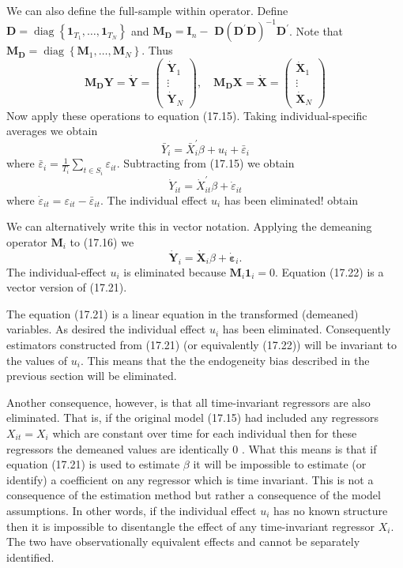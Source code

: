 \documentclass[10pt]{article}
\begin{document}
We can also define the full-sample within operator. Define $\boldsymbol{D}=\operatorname{diag}\left\{\mathbf{1}_{T_{1}}, \ldots, \mathbf{1}_{T_{N}}\right\}$ and $\boldsymbol{M}_{\boldsymbol{D}}=\boldsymbol{I}_{n}-$ $\boldsymbol{D}\left(\boldsymbol{D}^{\prime} \boldsymbol{D}\right)^{-1} \boldsymbol{D}^{\prime}$. Note that $\boldsymbol{M}_{\boldsymbol{D}}=\operatorname{diag}\left\{\boldsymbol{M}_{1}, \ldots, \boldsymbol{M}_{N}\right\}$. Thus
$$
\boldsymbol{M}_{\boldsymbol{D}} \boldsymbol{Y}=\dot{\boldsymbol{Y}}=\left(\begin{array}{c}
\dot{\boldsymbol{Y}}_{1} \\
\vdots \\
\dot{\boldsymbol{Y}}_{N}
\end{array}\right), \quad \boldsymbol{M}_{\boldsymbol{D}} \boldsymbol{X}=\dot{\boldsymbol{X}}=\left(\begin{array}{c}
\dot{\boldsymbol{X}}_{1} \\
\vdots \\
\dot{\boldsymbol{X}}_{N}
\end{array}\right)
$$
Now apply these operations to equation (17.15). Taking individual-specific averages we obtain
$$
\bar{Y}_{i}=\bar{X}_{i}^{\prime} \beta+u_{i}+\bar{\varepsilon}_{i}
$$
where $\bar{\varepsilon}_{i}=\frac{1}{T_{i}} \sum_{t \in S_{i}} \varepsilon_{i t}$. Subtracting from (17.15) we obtain
$$
\dot{Y}_{i t}=\dot{X}_{i t}^{\prime} \beta+\dot{\varepsilon}_{i t}
$$
where $\dot{\varepsilon}_{i t}=\varepsilon_{i t}-\bar{\varepsilon}_{i t}$. The individual effect $u_{i}$ has been eliminated! obtain

We can alternatively write this in vector notation. Applying the demeaning operator $\boldsymbol{M}_{i}$ to (17.16) we
$$
\dot{\boldsymbol{Y}}_{i}=\dot{\boldsymbol{X}}_{i} \beta+\dot{\boldsymbol{\varepsilon}}_{i} .
$$
The individual-effect $u_{i}$ is eliminated because $\boldsymbol{M}_{i} \mathbf{1}_{i}=0$. Equation (17.22) is a vector version of (17.21).

The equation (17.21) is a linear equation in the transformed (demeaned) variables. As desired the individual effect $u_{i}$ has been eliminated. Consequently estimators constructed from (17.21) (or equivalently (17.22)) will be invariant to the values of $u_{i}$. This means that the the endogeneity bias described in the previous section will be eliminated.

Another consequence, however, is that all time-invariant regressors are also eliminated. That is, if the original model (17.15) had included any regressors $X_{i t}=X_{i}$ which are constant over time for each individual then for these regressors the demeaned values are identically 0 . What this means is that if equation (17.21) is used to estimate $\beta$ it will be impossible to estimate (or identify) a coefficient on any regressor which is time invariant. This is not a consequence of the estimation method but rather a consequence of the model assumptions. In other words, if the individual effect $u_{i}$ has no known structure then it is impossible to disentangle the effect of any time-invariant regressor $X_{i}$. The two have observationally equivalent effects and cannot be separately identified.
\end{document}
